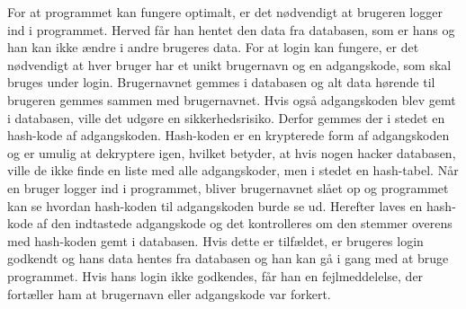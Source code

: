 For at programmet kan fungere optimalt, er det nødvendigt at brugeren logger ind i programmet. Herved får han hentet den data fra databasen, som er hans og han kan ikke ændre i andre brugeres data.
For at login kan fungere, er det nødvendigt at hver bruger har et unikt brugernavn og en adgangskode, som skal bruges under login. Brugernavnet gemmes i databasen og alt data hørende til brugeren gemmes sammen med brugernavnet. Hvis også adgangskoden blev gemt i databasen, ville det udgøre en sikkerhedsrisiko. Derfor gemmes der i stedet en hash-kode af adgangskoden. Hash-koden er en krypterede form af adgangskoden og er umulig at dekryptere igen, hvilket betyder, at hvis nogen hacker databasen, ville de ikke finde en liste med alle adgangskoder, men i stedet en hash-tabel.
Når en bruger logger ind i programmet, bliver brugernavnet slået op og programmet kan se hvordan hash-koden til adgangskoden burde se ud. Herefter laves en hash-kode af den indtastede adgangskode og det kontrolleres om den stemmer overens med hash-koden gemt i databasen. Hvis dette er tilfældet, er brugeres login godkendt og hans data hentes fra databasen og han kan gå i gang med at bruge programmet. Hvis hans login ikke godkendes, får han en fejlmeddelelse, der fortæller ham at brugernavn eller adgangskode var forkert. 
